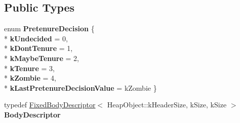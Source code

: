 \subsection*{Public Types}
\begin{DoxyCompactItemize}
\item 
enum {\bfseries Pretenure\+Decision} \{ \\*
{\bfseries k\+Undecided} = 0, 
\\*
{\bfseries k\+Dont\+Tenure} = 1, 
\\*
{\bfseries k\+Maybe\+Tenure} = 2, 
\\*
{\bfseries k\+Tenure} = 3, 
\\*
{\bfseries k\+Zombie} = 4, 
\\*
{\bfseries k\+Last\+Pretenure\+Decision\+Value} = k\+Zombie
 \}\hypertarget{classv8_1_1internal_1_1_allocation_site_a90e0736002b73f20d96abede63a5395b}{}\label{classv8_1_1internal_1_1_allocation_site_a90e0736002b73f20d96abede63a5395b}

\item 
typedef \hyperlink{classv8_1_1internal_1_1_fixed_body_descriptor}{Fixed\+Body\+Descriptor}$<$ Heap\+Object\+::k\+Header\+Size, k\+Size, k\+Size $>$ {\bfseries Body\+Descriptor}\hypertarget{classv8_1_1internal_1_1_allocation_site_a8cacad07f0e02a96cbd772ab4f3f8e70}{}\label{classv8_1_1internal_1_1_allocation_site_a8cacad07f0e02a96cbd772ab4f3f8e70}

\end{DoxyCompactItemize}
